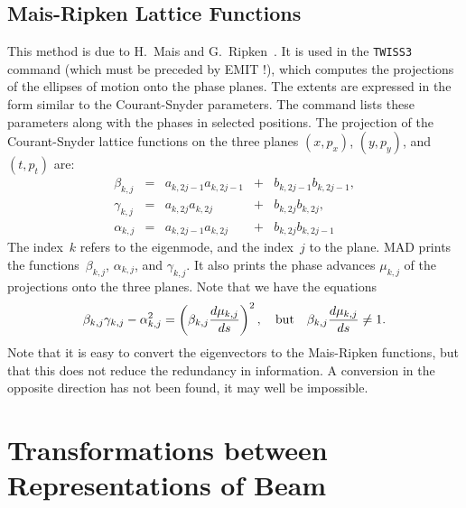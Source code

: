 \subsection{Mais-Ripken Lattice Functions}
\label{EMTWGO}
This method is due to H.~Mais and G.~Ripken~\cite{MAI82,RIP70}.
It is used in the {\tt TWISS3} command (which must be preceded by EMIT !),
which computes the projections of the ellipses of motion onto the
phase planes.
The extents are expressed in the form similar to the Courant-Snyder
parameters.
The command lists these parameters along with the phases in selected
positions.
The projection of the Courant-Snyder lattice functions on the three
planes $(x,p_x)$, $(y,p_y)$, and $(t,p_t)$ are:
\begin{equation}\begin{array}{lclcll}
\beta_{k,j}  &=&a_{k,2j-1}a_{k,2j-1}&+&b_{k,2j-1}b_{k,2j-1},\\
\gamma_{k,j} &=&a_{k,2j  }a_{k,2j  }&+&b_{k,2j  }b_{k,2j  },\\
\alpha_{k,j} &=&a_{k,2j-1}a_{k,2j  }&+&b_{k,2j  }b_{k,2j-1}
\end{array}\end{equation}
The index~$k$ refers to the eigenmode, and the index~$j$ to the plane.
MAD prints the functions~$\beta_{k,j}$, $\alpha_{k,j}$, and $\gamma_{k,j}$.
It also prints the phase advances $\mu_{k,j}$ of the projections onto
the three planes.
Note that we have the equations
\begin{equation}
\beta_{k,j} \gamma_{k,j} - \alpha_{k,j}^2 = 
\left( \beta_{k,j} \frac{d \mu_{k,j}}{ds} \right)^2, \quad
\hbox{\bf\rm but} \quad \beta_{k,j} \frac{d \mu_{k,j}}{ds} \neq 1.
\end{equation}
Note that it is easy to convert the eigenvectors to the Mais-Ripken
functions, but that this does not reduce the redundancy in
information.
A conversion in the opposite direction has not been found,
it may well be impossible.
 
 
\section{Transformations between Representations of Beam}
 
